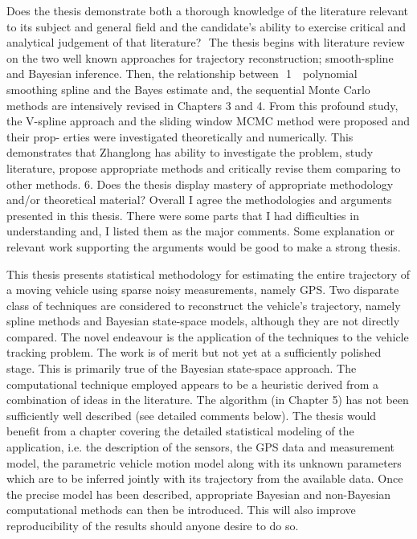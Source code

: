 \documentclass[a4paper,18pt]{extarticle}
\begin{document}
Does the thesis demonstrate both a thorough knowledge of the literature relevant to its subject and general field and the candidate’s ability to exercise critical and analytical judgement of that literature?  The thesis begins with literature review on the two well known approaches for trajectory reconstruction; smooth-spline and Bayesian inference. Then, the relationship between  1  
polynomial smoothing spline and the Bayes estimate and, the sequential Monte Carlo methods are intensively revised in Chapters 3 and 4. From this profound study, the V-spline approach and the sliding window MCMC method were proposed and their prop- erties were investigated theoretically and numerically. This demonstrates that Zhanglong has ability to investigate the problem, study literature, propose appropriate methods and critically revise them comparing to other methods. 
6. Does the thesis display mastery of appropriate methodology and/or theoretical material? 
Overall I agree the methodologies and arguments presented in this thesis. There were some parts that I had difficulties in understanding and, I listed them as the major comments. Some explanation or relevant work supporting the arguments would be good to make a strong thesis. 




This thesis presents statistical methodology for estimating the entire trajectory of a moving vehicle using sparse noisy measurements, namely GPS. Two disparate class of techniques are considered to reconstruct the vehicle’s trajectory, namely spline methods and Bayesian state-space models, although they are not directly compared. The novel endeavour is the application of the techniques to the vehicle tracking problem. The work is of merit but not yet at a sufficiently polished stage. This is primarily true of the Bayesian state-space approach. The computational technique employed appears to be a heuristic derived from a combination of ideas in the literature. The algorithm (in Chapter 5) has not been sufficiently well described (see detailed comments below). The thesis would benefit from a chapter covering the detailed statistical modeling of the application, i.e. the description of the sensors, the GPS data and measurement model, the parametric vehicle motion model along with its unknown parameters which are to be inferred jointly with its trajectory from the available data. Once the precise model has been described, appropriate Bayesian and non-Bayesian computational methods can then be introduced. This will also improve reproducibility of the results should anyone desire to do so. 
\end{document}
